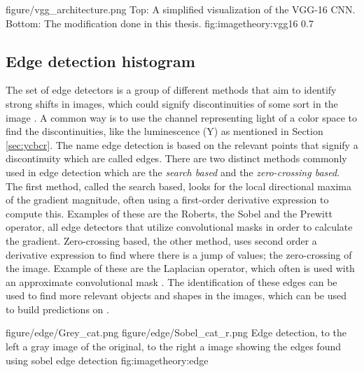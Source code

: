 \singlefigurenear
{figure/vgg_architecture.png}
{Top: A simplified visualization of the VGG-16 CNN. Bottom: The modification done in this thesis.}
{fig:imagetheory:vgg16}
{0.7}

\subsection{Edge detection histogram}
\label{sec:sob_feature}
The set of edge detectors is a group of different methods that aim to identify strong shifts in images, which could signify discontinuities of some sort in the image \cite{canny1986computational}. A common way is to use the channel representing light of a color space to find the discontinuities, like the luminescence (Y) as mentioned in Section \ref{sec:ycbcr}. The name edge detection is based on the relevant points that signify a discontinuity which are called edges. There are two distinct methods commonly used in edge detection which are the \emph{search based} and the \emph{zero-crossing based}. The first method, called the search based, looks for the local directional maxima of the gradient magnitude, often using a first-order derivative expression to compute this. Examples of these are the Roberts, the Sobel  and the Prewitt operator, all edge detectors that utilize convolutional masks in order to calculate the gradient. Zero-crossing based, the other method, uses second order a derivative expression to find where there is a jump of values; the zero-crossing of the image. Example of these are the Laplacian operator, which often is used with an approximate convolutional mask \cite{jain1995machine}. The identification of these edges can be used to find more relevant objects and shapes in the images, which can be used to build predictions on \cite{maini2009study}. 

\twofigure
{figure/edge/Grey_cat.png}
{figure/edge/Sobel_cat_r.png}
{Edge detection, to the left a gray image of the original, to the right a image showing the edges found using sobel edge detection}
{fig:imagetheory:edge} 
